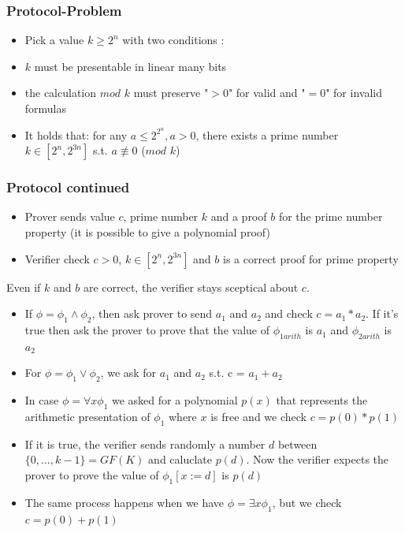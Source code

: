 \documentclass[hyperref={pdfpagelabels=false},t,10pt]{beamer}
\begin{document}
\begin{frame}
  \frametitle{Protocol-Problem}
  \begin{itemize}
    \item Pick a value $k \geq 2^n$ with two conditions : 
    \item $k$ must be presentable in linear many bits \pause
    \item the calculation $mod$ $k$ must preserve "$>0$" for valid and "$=0$" for invalid formulas
    \item It holds that: for any $a \leq 2^{2^{n}}, a>0$, there exists a prime number $k \in [2^n, 2^{3n}]$ s.t. $a \not\equiv 0 $ ($mod$ $k$)
  \end{itemize}
\end{frame}

\begin{frame}
  \frametitle{Protocol continued}
  \begin{itemize}
    \item Prover sends value $c$, prime number $k$ and a proof $b$ for the prime number property (it is possible to give a polynomial proof) \pause
    \item Verifier check $c>0$, $k \in [2^n, 2^{3n}]$ and $b$ is a correct proof for prime property 
  \end{itemize}
  Even if $k$ and $b$ are correct, the verifier stays sceptical about $c$. \pause

  \begin{itemize}
    \item If $\phi = \phi_1 \land \phi_2 $, then ask prover to send $a_1$ and $a_2$ and check $c = a_1 * a_2$. If it's true then ask the prover to prove that the value of $\phi_{1arith}$ is $a_1$ and $\phi_{2arith}$ is $a_2$
    \item For $\phi = \phi_1 \lor \phi_2$, we ask for $a_1$ and $a_2$ s.t. c = $a_1 + a_2$ \pause
    \item In case $\phi = \forall x \phi_1$ we asked for a polynomial $p(x)$ that represents the arithmetic presentation of $\phi_1$ where $x$ is free and we check $c = p(0) * p(1)$
    \item If it is true, the verifier sends randomly a number $d$ between $\{0,..., k-1\} = GF(K)$ and caluclate $p(d)$. Now the verifier expects the prover to prove the value of $\phi_1[x := d]$ is $p(d)$
    \item The same process happens when we have $\phi = \exists x \phi_1$, but we check $c = p(0) + p(1)$
  \end{itemize}
  
\end{frame}
\end{document}
